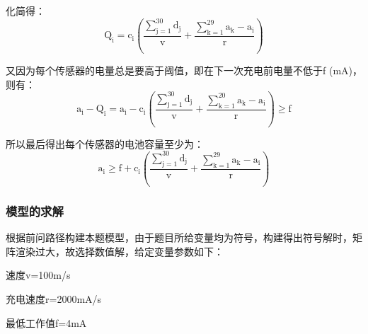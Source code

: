 \documentclass{article}
\begin{document}
化简得：
\begin{equation}
    \mathrm{Q_{i}=c_{i}\left(\frac{\sum_{j=1}^{30} d_{j}}{v}+\frac{\sum_{k=1}^{29} a_{k}-a_{i}}{r}\right)}
    \tag{21}
\end{equation}

又因为每个传感器的电量总是要高于阈值，即在下一次充电前电量不低于f (mA)，则有：
\begin{equation}
    \mathrm{a_{i}-Q_{i}=a_{i}-c_{i}\left(\frac{\sum_{j=1}^{30} d_{j}}{v}+\frac{\sum_{k=1}^{20} a_{k}-a_{i}}{r}\right) \geqslant f}
    \tag{22}
\end{equation}

所以最后得出每个传感器的电池容量至少为：
\begin{equation}
    \mathrm{a_{i} \geqslant f+c_{i}\left(\frac{\sum_{j=1}^{30} d_{j}}{v}+\frac{\sum_{k=1}^{29} a_{k}-a_{i}}{r}\right)}
    \tag{23}
\end{equation}

\subsubsection{模型的求解}
根据前问路径构建本题模型，由于题目所给变量均为符号，构建得出符号解时，矩阵渲染过大，故选择数值解，给定变量参数如下：

速度v=100m/s

充电速度r=2000mA/s

最低工作值f=4mA
\end{document}

